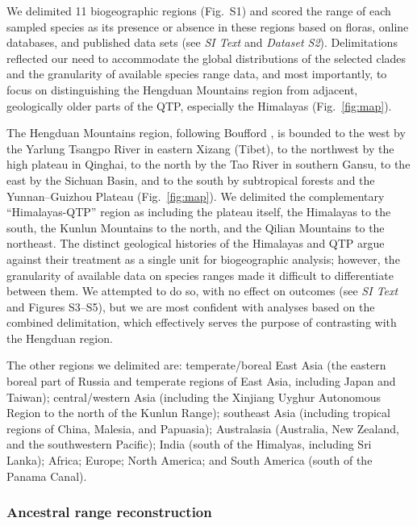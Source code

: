 We delimited 11 biogeographic regions (Fig.~S1) and scored the range
of each sampled species as its presence or absence in these regions
based on floras, online databases, and published data sets (see
\textit{SI Text} and \textit{Dataset S2}). Delimitations reflected our
need to accommodate the global distributions of the selected clades
and the granularity of available species range data, and most
importantly, to focus on distinguishing the Hengduan Mountains region
from adjacent, geologically older parts of the QTP, especially the
Himalayas (Fig.~\ref{fig:map}).

The Hengduan Mountains region, following Boufford
\citep{Boufford2014}, is bounded to the west by the Yarlung Tsangpo
River in eastern Xizang (Tibet), to the northwest by the high plateau
in Qinghai, to the north by the Tao River in southern Gansu, to the
east by the Sichuan Basin, and to the south by subtropical forests and
the Yunnan–Guizhou Plateau (Fig.~\ref{fig:map}). We delimited the
complementary ``Himalayas-QTP'' region as including the plateau
itself, the Himalayas to the south, the Kunlun Mountains to the north,
and the Qilian Mountains to the northeast. The distinct geological
histories of the Himalayas and QTP argue against their treatment as a
single unit for biogeographic analysis; however, the granularity of
available data on species ranges made it difficult to differentiate
between them. We attempted to do so, with no effect on outcomes (see
\textit{SI Text} and Figures S3--S5), but we are most confident with
analyses based on the combined delimitation, which effectively serves
the purpose of contrasting with the Hengduan region.

The other regions we delimited are: temperate/boreal East Asia (the
eastern boreal part of Russia and temperate regions of East Asia,
including Japan and Taiwan); central/western Asia (including the
Xinjiang Uyghur Autonomous Region to the north of the Kunlun Range);
southeast Asia (including tropical regions of China, Malesia, and
Papuasia); Australasia (Australia, New Zealand, and the southwestern
Pacific); India (south of the Himalyas, including Sri Lanka); Africa;
Europe; North America; and South America (south of the Panama Canal).

\subsubsection*{Ancestral range reconstruction}


